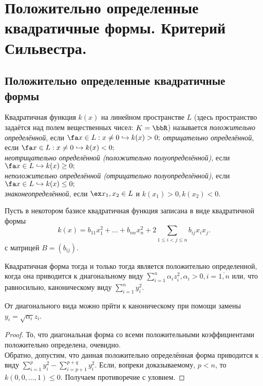 \chapter{Положительно определенные квадратичные формы. Критерий Сильвестра.}
\section{Положительно определенные квадратичные \\ формы}
  \begin{defn}
  Квадратичная функция $k(x)$ на линейном пространстве $L$ (здесь пространство задаётся над полем вещественных чисел: $K=\bbR$) называется \textit{положительно определённой}, если $\fa x \in L: x \neq 0 \hookrightarrow k(x)>0;$ \textit{отрицательно определённой}, если $\fa x \in L: x \neq 0 \hookrightarrow k(x)<0;$ \\
\textit{неотрицательно определённой (положительно полуопределённой)}, если $\fa x \in L \hookrightarrow k(x)\ge 0;$ \\
\textit{неположительно определённой (отрицательно полуопределённой)}, если $\fa x \in L \hookrightarrow k(x)\le 0;$ \\
\textit{знаконеопределённой}, если $\ex x_1,x_2 \in L$ и $k(x_1)>0,k(x_2)<0.$ \\
  \end{defn}
  Пусть в некотором базисе квадратичная функция записана в виде квадратичной формы
  \begin{equation}\label{25.1.common}
  k(x)=b_{11}x_1^2+\ldots+b_{nn}x_n^2+2\sum\limits_{1\le i<j\le n} b_{ij}x_ix_j.
  \end{equation}
с матрицей $B=(b_{ij})$.
  \begin{lemm}\label{25.1.lemm}
  Квадратичная форма тогда и только тогда является положительно определенной, когда она приводится к диагональному виду $\sum\limits_{i=1}^n\alpha_iz_i^2, \alpha_i>0, i=\overline{1,n}$ или, что равносильно, каноническому виду $\sum\limits_{i=1}^ny_i^2$.
  \end{lemm}
  \begin{notion}
  От диагонального вида можно прйти к каноническому при помощи замены $y_i=\sqrt{\alpha_i}z_i$.
  \end{notion}
  \begin{proof}
  То, что диагональная форма со всеми положительными коэффициентами положительно определена, очевидно. \\
  Обратно, допустим, что данная положительно определённая форма приводится к виду $\sum\limits_{i=1}^py_i^2-\sum\limits_{i=p+1}^{p+q}y_i^2$. Если, вопреки доказываемому, $p<n$, то $k(0,0,...,1)\le 0$. Получаем противоречие с уловием.
  \end{proof}
